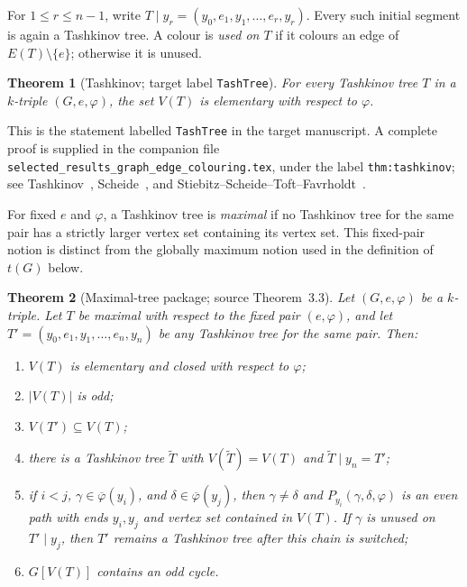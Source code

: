 \documentclass[11pt]{article}
\newtheorem{theorem}{Theorem}[section]
\theoremstyle{definition}
\newcommand{\set}[1]{\{#1\}}
\newcommand{\comp}{\mathbin{\setminus}}
\newcommand{\target}[1]{\texttt{#1}}
\begin{document}
For $1\le r\le n-1$, write
$T\mathbin{|}y_r=(y_0,e_1,y_1,\ldots,e_r,y_r)$. Every such initial segment
is again a Tashkinov tree. A colour is \emph{used on $T$} if it colours an
edge of $E(T)\comp\set e$; otherwise it is unused.

\begin{theorem}[Tashkinov; target label \target{TashTree}]
\label{TashTree}\label{Scheide-Theorem-3.2}
For every Tashkinov tree $T$ in a $k$-triple $(G,e,\varphi)$, the set $V(T)$
is elementary with respect to $\varphi$.
\end{theorem}

This is the statement labelled \target{TashTree} in the target manuscript.
A complete proof is supplied in the companion file
\texttt{selected\_results\_graph\_edge\_colouring.tex}, under the label
\texttt{thm:tashkinov}; see Tashkinov~\cite{T},
Scheide~\cite[Theorem~3.2]{S}, and
Stiebitz--Scheide--Toft--Favrholdt~\cite[Theorem~5.1]{SSTF}.

For fixed $e$ and $\varphi$, a Tashkinov tree is \emph{maximal} if no
Tashkinov tree for the same pair has a strictly larger vertex set containing
its vertex set. This fixed-pair notion is distinct from the globally maximum
notion used in the definition of $t(G)$ below.

\begin{theorem}[Maximal-tree package; source Theorem~3.3]
\label{Scheide-Theorem-3.3}\label{maximal-tree-package}
Let $(G,e,\varphi)$ be a $k$-triple. Let $T$ be maximal with respect to the
fixed pair $(e,\varphi)$, and let
$T'=(y_0,e_1,y_1,\ldots,e_n,y_n)$ be any Tashkinov tree for the same pair.
Then:
\begin{enumerate}[label=\textup{(\alph*)}]
\item $V(T)$ is elementary and closed with respect to $\varphi$;
\item $|V(T)|$ is odd;
\item $V(T')\subseteq V(T)$;
\item there is a Tashkinov tree $\widetilde T$ with
      $V(\widetilde T)=V(T)$ and
      $\widetilde T\mathbin{|}y_n=T'$;
\item if $i<j$, $\gamma\in\overline\varphi(y_i)$, and
      $\delta\in\overline\varphi(y_j)$, then $\gamma\ne\delta$ and
      $P_{y_i}(\gamma,\delta,\varphi)$ is an even path with ends
      $y_i,y_j$ and vertex set contained in $V(T)$. If $\gamma$ is unused
      on $T'\mathbin{|}y_j$, then $T'$ remains a Tashkinov tree after this
      chain is switched;
\item $G[V(T)]$ contains an odd cycle.
\end{enumerate}
\end{theorem}
\end{document}
